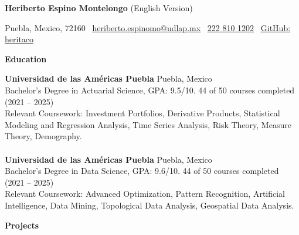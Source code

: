 \documentclass[9pt]{extarticle} %
\begin{document}
{\fontsize{10pt}{12pt}\selectfont
\begin{center}
    \textbf{Heriberto Espino Montelongo} (English Version) \\
    \vspace{-1ex} %
\end{center}
}

\begin{center}
    Puebla, Mexico, 72160 \textbullet \ 
    \href{mailto:heriberto.espinomo@udlap.mx}{\textcolor{customblue}{\underline{heriberto.espinomo@udlap.mx}}} \textbullet \ 
    \href{tel:+522228101202}{\textcolor{customblue}{\underline{222 810 1202}}} \textbullet \ 
    \href{https://github.com/heritaco}{\textcolor{customblue}{\underline{GitHub: heritaco}}}
\end{center}



\begin{center}
    \vspace{1ex}
    \textbf{Education}
    \vspace{-2ex}
\end{center}

\textbf{Universidad de las Américas Puebla} \hfill Puebla, Mexico\\
Bachelor's Degree in Actuarial Science, GPA: 9.5/10. \hfill  44 of 50 courses completed (2021 -- 2025) \\
Relevant Coursework: Investment Portfolios, Derivative Products, Statistical Modeling and Regression Analysis, Time Series Analysis, Risk Theory, Measure Theory, Demography.\\
\\
\textbf{Universidad de las Américas Puebla} \hfill Puebla, Mexico\\
Bachelor's Degree in Data Science, GPA: 9.6/10. \hfill  44 of 50 courses completed (2021 -- 2025)\\
Relevant Coursework: Advanced Optimization, Pattern Recognition, Artificial Intelligence, Data Mining, Topological Data Analysis, Geospatial Data Analysis.












\begin{center}
    \vspace{1ex}
    \textbf{Projects}
    \vspace{-1ex}
\end{center}
\end{document}
